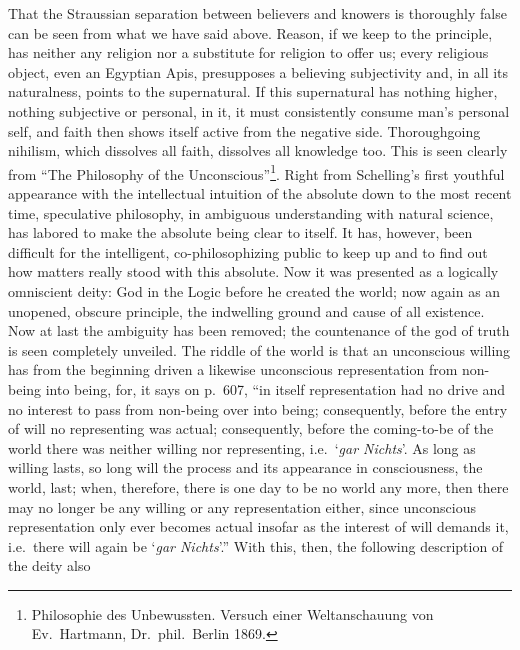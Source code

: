 \documentclass[12pt,a4paper]{article}
\newcommand{\opage}[1]{\marginnote{\footnotesize\textit{[#1]}}}
\begin{document}
That the Straussian separation between believers and knowers is
thoroughly false can be seen from what we have said above. Reason, if we
keep to the principle, has neither any religion nor a substitute for
religion to offer us; every religious object, even an Egyptian Apis,
presupposes a believing subjectivity and, in all its naturalness, points
to the supernatural. If this supernatural has nothing higher, nothing
subjective or personal, in it, it must consistently consume man's
personal self, and faith then shows itself active from the negative
side. Thoroughgoing nihilism, which dissolves all faith, dissolves all
knowledge too. This is seen clearly from ``The Philosophy of the
Unconscious''\footnote{Philosophie des Unbewussten. Versuch einer Weltanschauung von
Ev.\ Hartmann, Dr.\ phil.\ Berlin 1869.}. %
Right from Schelling's first
\opage{48}youthful appearance with the intellectual intuition of the absolute
down to the most recent time, speculative philosophy, in ambiguous
understanding with natural science, has labored to make the absolute
being clear to itself. It has, however, been difficult for the
intelligent, co-philosophizing public to keep up and to find out how
matters really stood with this absolute. Now it was presented as a
logically omniscient deity: God in the Logic before he created the
world; now again as an unopened, obscure principle, the indwelling
ground and cause of all existence. Now at last the ambiguity has been
removed; the countenance of the god of truth is seen completely
unveiled. The riddle of the world is that an unconscious willing has from
the beginning driven a likewise unconscious representation from
non-being into being, for, it says on p.\ 607, ``in itself representation
had no drive and no interest to pass from non-being over into being;
consequently, before the entry of will no representing was actual;
consequently, before the coming-to-be of the world there was neither
willing nor representing, i.e.\ `\textit{gar Nichts}'. As long as willing
lasts, so long will the process and its appearance in consciousness, the
world, last; when, therefore, there is one day to be no world any more,
then there may no longer be any willing or any representation either,
since unconscious representation only ever becomes actual insofar as the
interest of will demands it, i.e.\ there will again be `\textit{gar
Nichts}'.'' With this, then, the following description of the deity also
\end{document}
